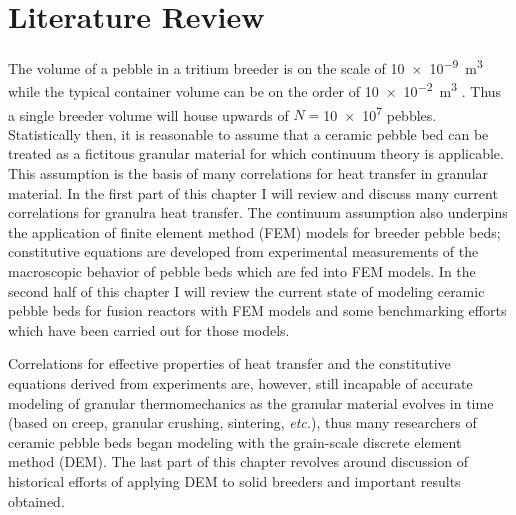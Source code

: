 \chapter{Literature Review}

The volume of a pebble in a tritium breeder is on the scale of \SI{10e-9}{\cubic\meter} while the typical container volume can be on the order of \SI{10e-2}{\cubic\meter} \cite{Cho2008}.  Thus a single breeder volume will house upwards of $N =$\num{10e7} pebbles. Statistically then, it is reasonable to assume that a ceramic pebble bed can be treated as a fictitous granular material for which continuum theory is applicable. This assumption is the basis of many correlations for heat transfer in granular material. In the first part of this chapter I will review and discuss many current correlations for granulra heat transfer. The continuum assumption also underpins the application of finite element method (FEM) models for breeder pebble beds; constitutive equations are developed from experimental measurements of the macroscopic behavior of pebble beds which are fed into FEM models. In the second half of this chapter I will review the current state of modeling ceramic pebble beds for fusion reactors with FEM models and some benchmarking efforts which have been carried out for those models. 

Correlations for effective properties of heat transfer and the constitutive equations derived from experiments are, however, still incapable of accurate modeling of granular thermomechanics as the granular material evolves in time (based on creep, granular crushing, sintering, \textit{etc.}), thus many researchers of ceramic pebble beds began modeling with the grain-scale discrete element method (DEM). The last part of this chapter revolves around discussion of historical efforts of applying DEM to solid breeders and important results obtained.


%
%
